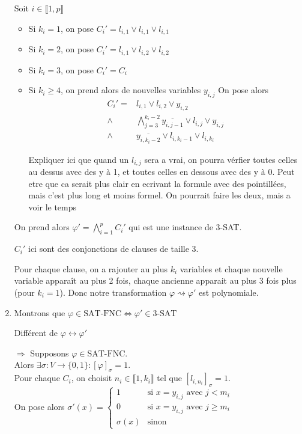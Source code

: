 \begin{enumerate}
	Soit $i\in \llbracket 1, p\rrbracket$
	\begin{itemize}[label=$\star$]
		\item Si $k_i = 1$, on pose $C_i' = l_{i,1} \vee l_{i,1} \vee l_{i,1}$
		\item Si $k_i = 2$, on pose $C_i' = l_{i,1} \vee l_{i, 2} \vee l_{i,2}$
		\item Si $k_i = 3$, on pose $C_i' = C_i$
		\item Si $k_i \geq 4$, on prend alors de nouvelles variables $y_{i,j}$
		On pose alors $$\begin{array}{rl}
			C_i' = & l_{i,1} \vee l_{i,2} \vee y_{i,2} \\
			\wedge & \bigwedge\limits_{j = 3}^{k_i - 2} \overline{y_{i, j-1}} \vee l_{i,j} \vee y_{i,j}\\
			\wedge & \overline{y_{i, k_i-2}} \vee l_{i, k_i-1} \vee l_{i, k_i}
		\end{array}$$
		\begin{com}
			Expliquer ici que quand un $l_{i,j}$ sera a vrai, on pourra vérfier toutes celles au dessus avec des y à 1, et toutes celles en dessous avec des y à 0. Peut etre que ca serait plus clair en ecrivant la formule avec des pointillées, mais c'est plus long et moins formel. On pourrait faire les deux, mais a voir le temps
		\end{com}
	\end{itemize}
	On prend alors $\varphi' = \bigwedge\limits_{i=1}^p C_i'$ qui est une instance de 3-SAT.\\
	\begin{rem}
		$C_i'$ ici sont des conjonctions de clauses de taille 3.
	\end{rem}

	Pour chaque clause, on a rajouter au plus $k_i$ variables et chaque nouvelle variable apparaît au plus 2 fois, chaque ancienne apparait au plus 3 fois plus (pour $k_i = 1$). Donc notre transformation $\varphi \rightsquigarrow \varphi'$ est polynomiale.
	
	\item Montrons que $\varphi \in \text{SAT-FNC} \Leftrightarrow \varphi' \in \text{3-SAT}$
	\begin{com}
		Différent de $\varphi \leftrightarrow \varphi'$
	\end{com}
	
	$\boxed{\Rightarrow}$ Supposons $\varphi \in \text{SAT-FNC}$.\\
	Alors $\exists \sigma : V \to \{0,1\} : [\varphi]_\sigma = 1$.\\
	Pour chaque $C_i$, on choisit $n_i \in \llbracket 1, k_i \rrbracket$ tel que $[l_{i, n_i}]_\sigma = 1$.\\
	On pose alors $\sigma'(x) = \left\{ \begin{array}{ll}
		1 & \text{si } x = y_{i,j} \text{ avec } j < m_i\\
		0 & \text{si } x = y_{i,j} \text{ avec } j \geq m_i\\
		\sigma(x) & \text{sinon}
	\end{array} \right.$\\
	

\end{enumerate}
